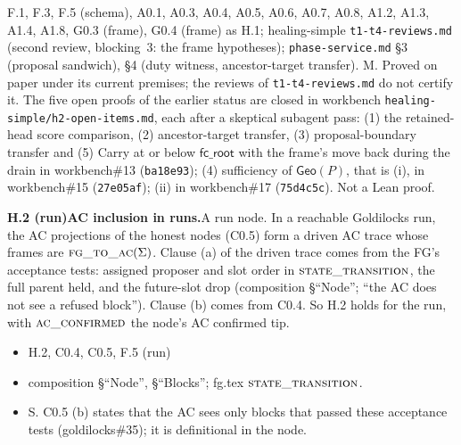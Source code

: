 \documentclass{article}
\newcommand{\fcroot}{\mathsf{fc\_root}}
\newcommand{\fname}[1]{\text{\textsc{#1}}}
\newcommand{\dagnode}[6]{%
\par\medskip\noindent\textbf{#1\enspace #2.}\enspace #3
\begin{itemize}[leftmargin=2.2em,itemsep=0pt,topsep=2pt]
\item[\emph{Uses}] #4
\item[\emph{Evid.}] #5
\item[\emph{Task}] #6
\end{itemize}}
\begin{document}
{F.1, F.3, F.5 (schema), A0.1, A0.3, A0.4, A0.5, A0.6, A0.7, A0.8, A1.2,
A1.3, A1.4, A1.8, G0.3 (frame), G0.4 (frame)}
{as H.1; healing-simple \texttt{t1-t4-reviews.md} (second review,
blocking~3: the frame hypotheses); \texttt{phase-service.md} \S3 (proposal
sandwich), \S4 (duty witness, ancestor-target transfer).}
{M.  Proved on paper under its current premises; the reviews of
\texttt{t1-t4-reviews.md} do not certify it.  The five open proofs of the
earlier status are closed in workbench \texttt{healing-simple/h2-open-items.md},
each after a skeptical subagent pass: (1) the retained-head score comparison,
(2) ancestor-target transfer, (3) proposal-boundary transfer and (5) Carry at
or below $\fcroot$ with the frame's move back during the drain in
workbench\#13 (\texttt{ba18e93}); (4) sufficiency of $\mathsf{Geo}(P)$, that
is (i), in workbench\#15 (\texttt{27e05af}); (ii) in workbench\#17
(\texttt{75d4c5c}).  Not a Lean proof.}

\dagnode{H.2 (run)}{AC inclusion in runs}{A run node.  In a reachable
Goldilocks run, the AC projections of the honest nodes (C0.5) form a driven
AC trace whose frames are $\fname{fg\_to\_ac}(\Sigma)$.  Clause (a) of the
driven trace comes from the FG's acceptance tests: assigned proposer and
slot order in $\fname{state\_transition}$, the full parent held, and the
future-slot drop (composition \S``Node''; ``the AC does not see a refused
block'').  Clause (b) comes from C0.4.  So H.2 holds for the run, with
$\fname{ac\_confirmed}$ the node's AC confirmed tip.}
{H.2, C0.4, C0.5, F.5 (run)}
{composition \S``Node'', \S``Blocks''; fg.tex $\fname{state\_transition}$.}
{S.  C0.5 (b) states that the AC sees only blocks that passed these
acceptance tests (goldilocks\#35); it is definitional in the node.}
\end{document}

